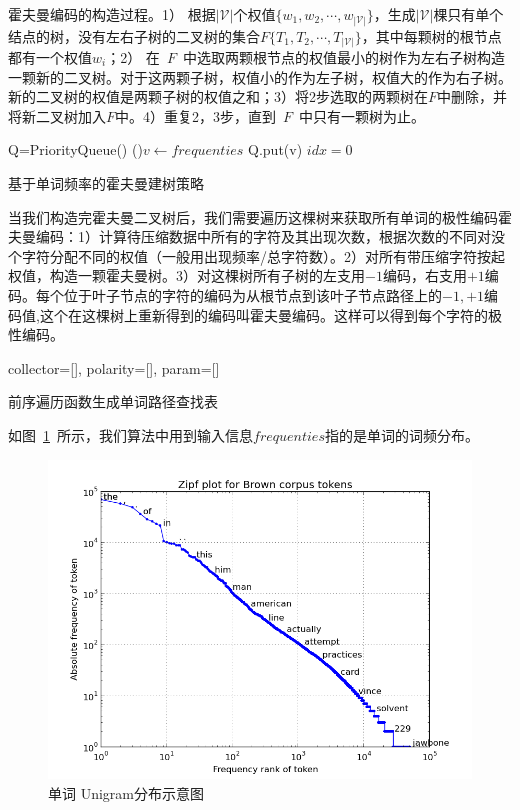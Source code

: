 霍夫曼编码的构造过程。1） 根据$\mathcal{|V|}$个权值$\{w_1,w_2,\cdots,w_{\mathcal{|V|}}\}$，生成$\mathcal{|V|}$棵只有单个结点的树，没有左右子树的二叉树的集合$F\{T_1,T_2,\cdots,T_{\mathcal{|V|}}\}$，其中每颗树的根节点都有一个权值$w_i$；2） 在~$F$~中选取两颗根节点的权值最小的树作为左右子树构造一颗新的二叉树。对于这两颗子树，权值小的作为左子树，权值大的作为右子树。新的二叉树的权值是两颗子树的权值之和；3）将2步选取的两颗树在$F$中删除，并将新二叉树加入$F$中。4）重复2，3步，直到~$F$~中只有一颗树为止。

\begin{algorithm}[!ht]
\SetAlgoLined
{}
{Q=PriorityQueue()} 
\For(){$v \gets frequenties$}{
{Q.put(v)}\;
}
{$idx=0$}\;
\caption{基于单词频率的霍夫曼建树策略}\label{code:huffman}
\end{algorithm}

当我们构造完霍夫曼二叉树后，我们需要遍历这棵树来获取所有单词的极性编码霍夫曼编码：1）计算待压缩数据中所有的字符及其出现次数，根据次数的不同对没个字符分配不同的权值（一般用出现频率/总字符数）。2）对所有带压缩字符按起权值，构造一颗霍夫曼树。3）对这棵树所有子树的左支用$-1$编码，右支用$+1$编码。每个位于叶子节点的字符的编码为从根节点到该叶子节点路径上的$-1,+1$编码值,这个在这棵树上重新得到的编码叫霍夫曼编码。这样可以得到每个字符的极性编码。
\begin{algorithm}[!ht]
\SetAlgoLined
{}
collector=[], polarity=[], param=[]\;
\caption{前序遍历函数生成单词路径查找表}\label{code:preorder}
\end{algorithm}
如图~\ref{fig:zipf}~所示，我们算法中用到输入信息$frequenties$指的是单词的词频分布。
\begin{figure}[!ht]
  \centering
\includegraphics[width=0.6\linewidth]{./figures/zipf.png}
\caption{单词 Unigram分布示意图}\label{fig:zipf}
\end{figure}

